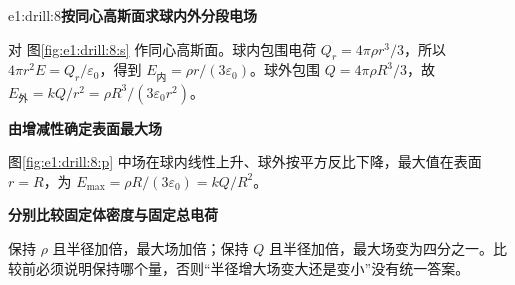\begin{drillsolution}{e1:drill:8}\textbf{按同心高斯面求球内外分段电场}\par\nobreak
对 图\ref{fig:e1:drill:8:s} 作同心高斯面。球内包围电荷 $Q_r=4\pi\rho r^3/3$，所以 $4\pi r^2E=Q_r/\varepsilon_0$，得到 $E_{\text{内}}=\rho r/(3\varepsilon_0)$。球外包围 $Q=4\pi\rho R^3/3$，故 $E_{\text{外}}=kQ/r^2=\rho R^3/(3\varepsilon_0r^2)$。



\par\medskip{}\noindent\textbf{由增减性确定表面最大场}\par\nobreak
图\ref{fig:e1:drill:8:p} 中场在球内线性上升、球外按平方反比下降，最大值在表面 $r=R$，为 $E_{\max}=\rho R/(3\varepsilon_0)=kQ/R^2$。

\par\medskip{}\noindent\textbf{分别比较固定体密度与固定总电荷}\par\nobreak
保持 $\rho$ 且半径加倍，最大场加倍；保持 $Q$ 且半径加倍，最大场变为四分之一。比较前必须说明保持哪个量，否则“半径增大场变大还是变小”没有统一答案。\end{drillsolution}
